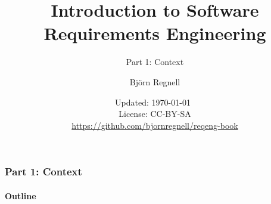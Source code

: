 \documentclass{reqenglecture}
\title{Introduction to Software Requirements Engineering}
\subtitle{Part 1: Context}
\author{Björn Regnell}
\date{\vspace{1em}\footnotesize Updated: \today~
\\ License: CC-BY-SA 
\\ \url{https://github.com/bjornregnell/reqeng-book} 
}
\begin{document}
\maketitle

\begin{frame}
\frametitle{Part 1: Context}
\framesubtitle{Outline}
\tableofcontents
\end{frame}



















\end{document}
